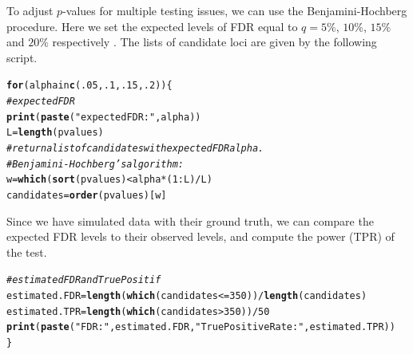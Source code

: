 \documentclass[12pt,a4paper,oneside]{article}\usepackage[]{graphicx}\usepackage[]{color}
\makeatletter
\newcommand{\hlstr}[1]{\textcolor[rgb]{0.192,0.494,0.8}{#1}}%
\newcommand{\hlcom}[1]{\textcolor[rgb]{0.678,0.584,0.686}{\textit{#1}}}%
\newcommand{\hlkwd}[1]{\textcolor[rgb]{0.737,0.353,0.396}{\textbf{#1}}}%
\newenvironment{kframe}{%
 \def\at@end@of@kframe{}%
 \ifinner\ifhmode%
  \def\at@end@of@kframe{\end{minipage}}%
  \begin{minipage}{\columnwidth}%
 \fi\fi%
 \def\FrameCommand##1{\hskip\@totalleftmargin \hskip-\fboxsep
 \colorbox{shadecolor}{##1}\hskip-\fboxsep
     \hskip-\linewidth \hskip-\@totalleftmargin \hskip\columnwidth}%
 \MakeFramed {\advance\hsize-\width
   \@totalleftmargin\z@ \linewidth\hsize
   \@setminipage}}%
 {\par\unskip\endMakeFramed%
 \at@end@of@kframe}
\newenvironment{knitrout}{}{} %
\makeatother
\begin{document}
\noindent
To adjust $p$-values for multiple testing issues, we can use the Benjamini-Hochberg procedure. Here we set the expected levels of FDR equal to $q = 5 \%$, $10 \%$, $15 \%$ and $20 \%$ respectively \citep{Benjamini_1995}. The lists of candidate loci are given by the following script.
\begin{knitrout}
\color{fgcolor}\begin{kframe}
\begin{alltt}
\hlkwd{for} (alpha in \hlkwd{c}(.05,.1,.15,.2)) \{
\hlcom{    # expected FDR}
    \hlkwd{print}(\hlkwd{paste}(\hlstr{"expected FDR:"}, alpha))
    L = \hlkwd{length}(pvalues)
\hlcom{    # return a list of candidates with expected FDR alpha.}
\hlcom{    # Benjamini-Hochberg's algorithm:}
    w = \hlkwd{which}(\hlkwd{sort}(pvalues) < alpha * (1:L) / L)
    candidates = \hlkwd{order}(pvalues)[w]
\end{alltt}


{\ttfamily\noindent\bfseries{}}\end{kframe}
\end{knitrout}

Since we have simulated data with their ground truth, we can compare the expected FDR levels to their observed levels, and compute the power (TPR) of the test.
\begin{knitrout}
\color{fgcolor}\begin{kframe}
\begin{alltt}
\hlcom{    # estimated FDR and True Positif}
    estimated.FDR = \hlkwd{length}(\hlkwd{which}(candidates <= 350))/\hlkwd{length}(candidates)
    estimated.TPR = \hlkwd{length}(\hlkwd{which}(candidates > 350))/50
    \hlkwd{print}(\hlkwd{paste}(\hlstr{"FDR:"}, estimated.FDR, \hlstr{"True Positive Rate:"}, estimated.TPR))
\}
\end{alltt}


{\ttfamily\noindent\bfseries{}}\end{kframe}
\end{knitrout}







\end{document}
